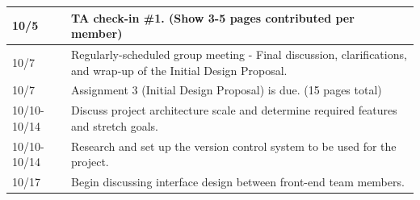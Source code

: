 \documentclass[
    paper=letter,
    parskip=half,
    fontsize=12pt,
    titlepage=firstiscover,
    toc=bibliography,
    numbers=endperiod
]{scrartcl}
\begin{document}
{\begin{tabularx}{\textwidth}{|l|X|}
        10/5          & TA check-in \#1. (Show 3-5 pages contributed per member)                                                                                                                                                                                                                                                                                                                                                                             \\\hline
        10/7          & Regularly-scheduled group meeting - Final discussion, clarifications, and wrap-up of the Initial Design Proposal.                                                                                                                                                                                                                                                                                                                    \\\hline
        10/7          & Assignment 3 (Initial Design Proposal) is due. (15 pages total)                                                                                                                                                                                                                                                                                                                                                                      \\\hline
        10/10-10/14   & Discuss project architecture scale and determine required features and stretch goals.                                                                                                                                                                                                                                                                                                                                                \\\hline
        10/10-10/14   & Research and set up the version control system to be used for the project.                                                                                                                                                                                                                                                                                                                                                           \\\hline
        10/17         & Begin discussing interface design between front-end team members.                                                                                                                                                                                                                                                                                                                                                                    \\\hline

\end{tabularx}}
\end{document}
